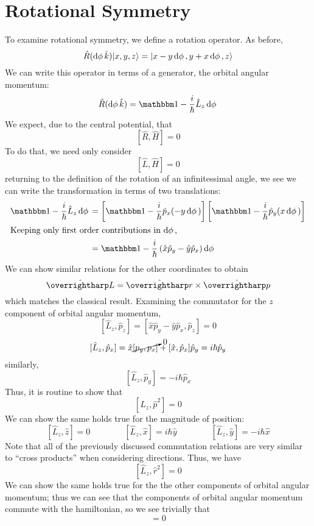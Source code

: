 \section{Rotational Symmetry}
To examine rotational symmetry, we define a rotation operator. As before,
\[\hat R(\d\phi \hat k)\k{x,y,z} = \k{x-y\d\phi, y+x\d\phi, z}\]
We can write this operator in terms of a generator, the orbital angular momentum:
\begin{equation}
	\hat R(\d\phi\kh) = \mathbbm 1 - \frac{i}{\hbar}\hat L_z \d\phi
\end{equation}
We expect, due to the central potential, that
\[[\hat R,\hat H] = 0\]
To do that, we need only consider
\[[\hat L, \hat H]= 0\]
returning to the definition of the rotation of an infinitessimal angle, we see we can write the transformation in terms of two translations:
\begin{align*}
	\mathbbm 1 - \frac{i}{\hbar}\hat L_z \d\phi &= \left[\mathbbm 1 -\frac{i}{\hbar}\hat p_x(-y\d\phi)\right]\left[\mathbbm 1 - \frac{i}{\hbar}\hat p_y(x\d\phi)\right]\\\intertext{Keeping only first order contributions in \(\d\phi\),}
						    &=\mathbbm 1 - \frac{i}{\hbar}\left(\hat x \hat p_y - \hat y\hat p_x\right)\d\phi
\end{align*}
We can show similar relations for the other coordinates to obtain
\begin{equation}
	\hat{\vv L} = \hat{\vv r}\times \hat{\vv p}
\end{equation}
which matches the classical result. Examining the commutator for the \(z\) component of orbital angular momentum,
\[[\hat L_z, \hat p_z] = [\hat x\hat p_y-\hat y\hat p_x, \hat p_z] = 0\]
\[[\hat L_z, \hat p_x] = \hat x\cancelto{0}{[p_y, p_x]}+[\hat x, \hat p_x]\hat p_y = i\hbar\hat p_y\]
similarly, 
\[[\hat L_z, \hat p_y] = -i\hbar \hat p_x\]
Thus, it is routine to show that
\[[\hat L_z, \hat p^2] = 0\]
We can show the same holds true for the magnitude of position:
\[[\hat L_z,\hat z] = 0 \qquad\qquad [\hat L_z, \hat x] = i\hbar \hat y \qquad\qquad [\hat L_z, \hat y] = -i\hbar \hat x\]
Note that all of the previously discussed commutation relations are very similar to ``cross products'' when considering directions. Thus, we have
\[[\hat L_z, \hat r^2]=0\]
We can show the same holds true for the the other components of orbital angular momentum; thus we can see that the components of orbital angular momentum commute with the hamiltonian, so we see trivially that
\begin{equation}
	[\hat L^2, \hat H] = 0
\end{equation}
